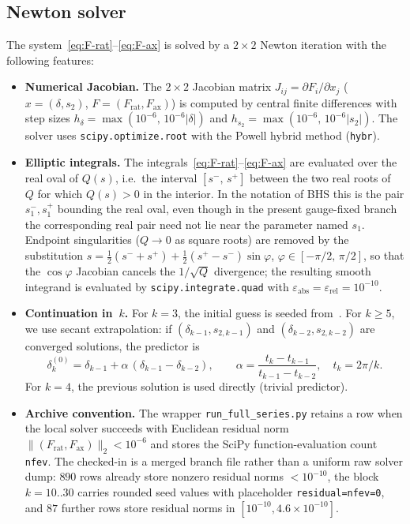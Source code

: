 \documentclass[11pt,a4paper]{article}
\theoremstyle{plain}
\theoremstyle{definition}
\theoremstyle{remark}
\newcommand{\abs}[1]{\lvert #1 \rvert}
\begin{document}
\subsection{Newton solver}\label{sec:newton}
The system~\eqref{eq:F-rat}--\eqref{eq:F-ax} is solved by a
$2 \times 2$ Newton iteration with the following features:
\begin{itemize}[nosep]
\item \textbf{Numerical Jacobian.}
  The $2 \times 2$ Jacobian matrix
  $J_{ij} = \partial F_i/\partial x_j$
  ($x = (\delta, s_2)$, $F = (F_{\mathrm{rat}}, F_{\mathrm{ax}})$)
  is computed by central finite differences with step sizes
  $h_{\delta} = \max(10^{-6},\, 10^{-6}\abs{\delta})$
  and $h_{s_2} = \max(10^{-6},\, 10^{-6}\abs{s_2})$.
  The solver uses \texttt{scipy.optimize.root} with the
  Powell hybrid method (\texttt{hybr}).
\item \textbf{Elliptic integrals.}
  The integrals~\eqref{eq:F-rat}--\eqref{eq:F-ax} are evaluated
  over the real oval of $Q(s)$, i.e.\ the interval
  $[s^-,\, s^+]$ between the two real roots of~$Q$ for which
  $Q(s) > 0$ in the interior.  In the notation of BHS this is the
  pair $s_1^-, s_1^+$ bounding the real oval, even though in the
  present gauge-fixed branch the corresponding real pair need not lie
  near the parameter named $s_1$.
  Endpoint singularities ($Q \to 0$ as square roots) are removed
  by the substitution $s = \tfrac12(s^- + s^+)
  + \tfrac12(s^+ - s^-)\sin\varphi$, $\varphi \in [-\pi/2,\,\pi/2]$,
  so that the $\cos\varphi$ Jacobian cancels the $1/\sqrt{Q}$
  divergence; the resulting smooth integrand is evaluated by
  \texttt{scipy.integrate.quad} with
  $\varepsilon_{\mathrm{abs}} = \varepsilon_{\mathrm{rel}} = 10^{-10}$.
\item \textbf{Continuation in~$k$.}
  For $k = 3$, the initial guess is seeded from~\cite{BHS25}.
  For $k \geq 5$, we use secant extrapolation: if
  $(\delta_{k-1}, s_{2,k-1})$ and $(\delta_{k-2}, s_{2,k-2})$ are
  converged solutions, the predictor is
  \[
    \delta_{k}^{(0)} = \delta_{k-1}
      + \alpha\,(\delta_{k-1} - \delta_{k-2}),
    \qquad
    \alpha = \frac{t_k - t_{k-1}}{t_{k-1} - t_{k-2}},
    \quad t_k = 2\pi/k.
  \]
  For $k = 4$, the previous solution is used directly (trivial
  predictor).
\item \textbf{Archive convention.}
  The wrapper \texttt{run\_full\_series.py} retains a row when the local
  solver succeeds with Euclidean residual norm
  $\|(F_{\mathrm{rat}},F_{\mathrm{ax}})\|_2 < 10^{-6}$ and stores the
  SciPy function-evaluation count \texttt{nfev}.  The checked-in
   is a merged branch file rather than a
  uniform raw solver dump: $890$ rows already store nonzero residual norms
  $<10^{-10}$, the block $k=10..30$ carries rounded seed values with
  placeholder \texttt{residual=nfev=0}, and $87$ further rows store
  residual norms in $[10^{-10}, 4.6\times 10^{-10}]$.
\end{itemize}
\end{document}

